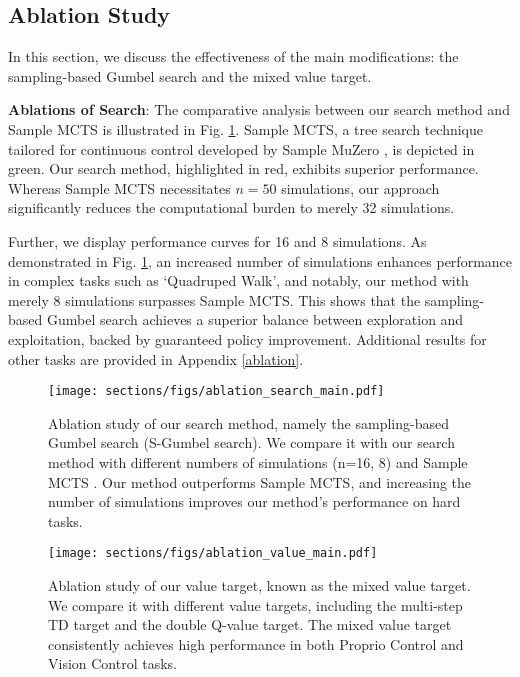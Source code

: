 \subsection{Ablation Study}
\label{ablation_sec}

In this section, we discuss the effectiveness of the main modifications: the sampling-based Gumbel search and the mixed value target. 

\textbf{Ablations of Search}: The comparative analysis between our search method and Sample MCTS is illustrated in Fig. \ref{ablation_search_main}. Sample MCTS, a tree search technique tailored for continuous control developed by Sample MuZero \citep{hubert2021learning}, is depicted in green. Our search method, highlighted in red, exhibits superior performance. Whereas Sample MCTS necessitates $n = 50$ simulations, our approach significantly reduces the computational burden to merely 32 simulations.

Further, we display performance curves for 16 and 8 simulations. As demonstrated in Fig. \ref{ablation_search_main}, an increased number of simulations enhances performance in complex tasks such as `Quadruped Walk', and notably, our method with merely 8 simulations surpasses Sample MCTS. This shows that the sampling-based Gumbel search achieves a superior balance between exploration and exploitation, backed by guaranteed policy improvement. Additional results for other tasks are provided in Appendix  \ref{ablation}.

\begin{figure}[t]
\centering
\texttt{[image: sections/figs/ablation\_search\_main.pdf]}
\caption{
Ablation study of our search method, namely the sampling-based Gumbel search (S-Gumbel search). We compare it with our search method with different numbers of simulations (n=16, 8) and Sample MCTS \citep{hubert2021learning}. Our method outperforms Sample MCTS, and increasing the number of simulations improves our method's performance on hard tasks.}
\label{ablation_search_main}
\end{figure}


\begin{figure}[t]
\centering
\texttt{[image: sections/figs/ablation\_value\_main.pdf]}
\caption{
Ablation study of our value target, known as the mixed value target. We compare it with different value targets, including the multi-step TD target and the double Q-value target. The mixed value target consistently achieves high performance in both Proprio Control and Vision Control tasks.}
\label{ablation_value_main}
\vspace{-10pt}
\end{figure}
\vspace{-5pt}


